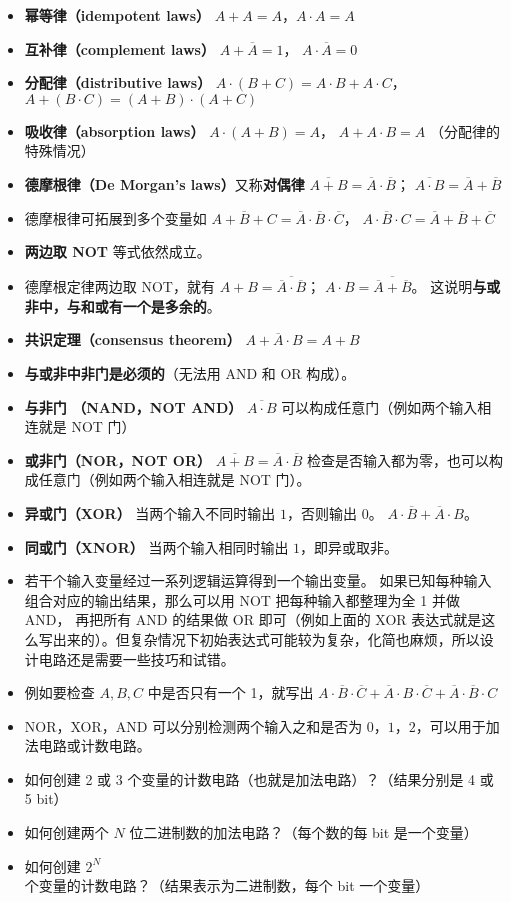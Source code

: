 \begin{itemize}
\item \textbf{幂等律（idempotent laws）} $A+A=A$，$A\cdot A=A$
\item \textbf{互补律（complement laws）} $A+\overline A = 1$， $A\cdot \overline A = 0$
\item \textbf{分配律（distributive laws）} $A\cdot(B+C)=A\cdot B+A\cdot C$， $A+(B\cdot C) = (A+B)\cdot(A+C)$
\item \textbf{吸收律（absorption laws）} $A\cdot(A+B) = A$， $A+A\cdot B = A$ （分配律的特殊情况）
\item \textbf{德摩根律（De Morgan's laws）}又称\textbf{对偶律} $\overline{A+B} = \overline A \cdot \overline B$； $\overline{A \cdot B} = \overline A + \overline B$
\item 德摩根律可拓展到多个变量如 $\overline{A+B+C} = \overline A \cdot \overline B \cdot \overline C$， $\overline{A \cdot B\cdot C} = \overline A + \overline B + \overline C$
\item \textbf{两边取 NOT} 等式依然成立。
\item 德摩根定律两边取 NOT，就有 $A+B = \overline{\overline A \cdot \overline B}$； $A \cdot B = \overline{\overline A + \overline B}$。 这说明\textbf{与或非中，与和或有一个是多余的}。
\item \textbf{共识定理（consensus theorem）} $A + \overline A \cdot B = A + B$
\item \textbf{与或非中非门是必须的}（无法用 AND 和 OR 构成）。
\item \textbf{与非门 （NAND，NOT AND）} $\overline{A\cdot B}$ 可以构成任意门（例如两个输入相连就是 NOT 门）
\item \textbf{或非门（NOR，NOT OR）} $\overline{A+B}=\overline A\cdot\overline B$ 检查是否输入都为零，也可以构成任意门（例如两个输入相连就是 NOT 门）。
\item \textbf{异或门（XOR）} 当两个输入不同时输出 $1$，否则输出 $0$。 $A\cdot\overline B+\overline A\cdot B$。
\item \textbf{同或门（XNOR）} 当两个输入相同时输出 $1$，即异或取非。
\item 若干个输入变量经过一系列逻辑运算得到一个输出变量。 如果已知每种输入组合对应的输出结果，那么可以用 NOT 把每种输入都整理为全 1 并做 AND， 再把所有 AND 的结果做 OR 即可（例如上面的 XOR 表达式就是这么写出来的）。但复杂情况下初始表达式可能较为复杂，化简也麻烦，所以设计电路还是需要一些技巧和试错。
\item 例如要检查 $A,B,C$ 中是否只有一个 1，就写出 $A\cdot\overline B\cdot\overline C + \overline A\cdot B\cdot\overline C + \overline A\cdot\overline B\cdot C$
\item NOR，XOR，AND 可以分别检测两个输入之和是否为 $0$，$1$，$2$，可以用于加法电路或计数电路。
\end{itemize}

\begin{exercise}{}
\begin{itemize}
\item 如何创建 2 或 3 个变量的计数电路（也就是加法电路）？（结果分别是 4 或 5 bit）
\item 如何创建两个 $N$ 位二进制数的加法电路？（每个数的每 bit 是一个变量）
\item 如何创建 $2^N$ 个变量的计数电路？（结果表示为二进制数，每个 bit 一个变量）
\end{itemize}
\end{exercise}
